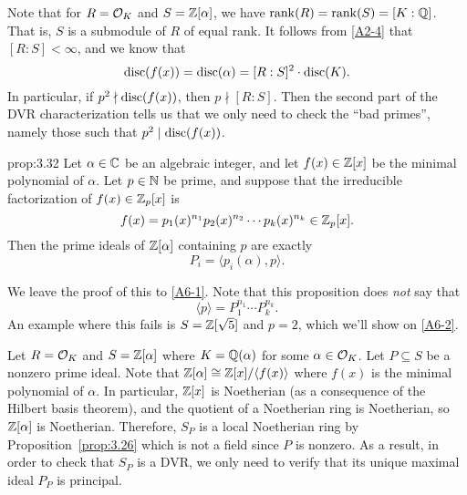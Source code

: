Note that for $R = {\cal O}_K$ and $S = \mathbb{Z}[\alpha]$, we have $\operatorname{rank}(R) 
= \operatorname{rank}(S) = [K : \mathbb{Q}]$. That is, $S$ is a submodule of $R$ of equal rank. 
It follows from \ref{A2-4} that $[R : S] < \infty$, and we know that 
\[ \operatorname{disc}(f(x)) = \operatorname{disc}(\alpha) = [R : S]^2 \cdot \operatorname{disc}(K). \] 
In particular, if $p^2 \nmid \operatorname{disc}(f(x))$, then $p \nmid [R : S]$. Then 
the second part of the DVR characterization tells us that we only need 
to check the ``bad primes'', namely those such that $p^2 \mid \operatorname{disc}(f(x))$.

\begin{prop}{prop:3.32}
    Let $\alpha \in \mathbb{C}$ be an algebraic integer, and let $f(x) \in \mathbb{Z}[x]$ be 
    the minimal polynomial of $\alpha$. Let $p \in \mathbb{N}$ be prime, and 
    suppose that the irreducible factorization of $f(x) \in \mathbb{Z}_p[x]$ is 
    \[ f(x) = p_1(x)^{n_1} p_2(x)^{n_2} \cdots p_k(x)^{n_k} \in \mathbb{Z}_p[x]. \] 
    Then the prime ideals of $\mathbb{Z}[\alpha]$ containing $p$ are exactly 
    \[ P_i = \langle p_i(\alpha), p \rangle. \] 
\end{prop}\vspace{-0.25cm}

We leave the proof of this to \ref{A6-1}. Note that this proposition 
does \emph{not} say that 
\[ \langle p \rangle = P_1^{n_1} \cdots P_k^{n_k}. \] 
An example where this fails is $S = \mathbb{Z}[\sqrt{5}]$ and $p = 2$, 
which we'll show on \ref{A6-2}.

Let $R = {\cal O}_K$ and $S = \mathbb{Z}[\alpha]$ where $K = \mathbb{Q}(\alpha)$ for some 
$\alpha \in {\cal O}_K$. Let $P \subseteq S$ be a nonzero prime ideal. 
Note that $\mathbb{Z}[\alpha] \cong \mathbb{Z}[x]/\langle f(x) \rangle$ where $f(x)$ 
is the minimal polynomial of $\alpha$. In particular, $\mathbb{Z}[x]$ is 
Noetherian (as a consequence of the Hilbert basis theorem), and the quotient 
of a Noetherian ring is Noetherian, so $\mathbb{Z}[\alpha]$ is Noetherian. 
Therefore, $S_P$ is a local Noetherian ring by Proposition~\ref{prop:3.26}
which is not a field since $P$ is nonzero. As a result, in order to check 
that $S_P$ is a DVR, we only need to verify that its unique maximal ideal 
$P_P$ is principal.

